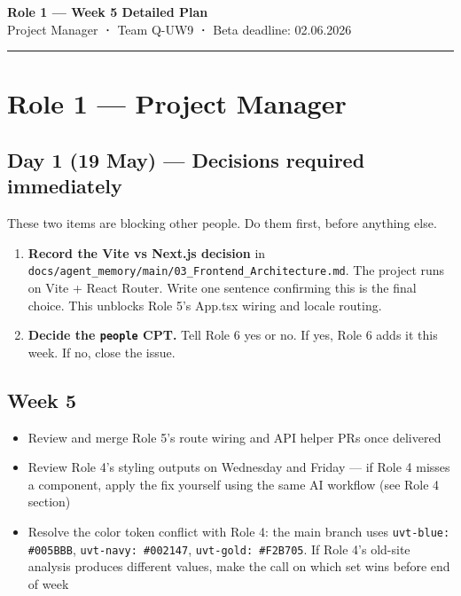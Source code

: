 \documentclass[11pt,a4paper]{article}
\begin{document}
\begin{center}
    {\Large\bfseries\color{uvtBlue} Role 1 — Week 5 Detailed Plan}\\[0.4em]
    {\small Project Manager \textbf{·} Team Q-UW9 \textbf{·} Beta deadline: 02.06.2026}
\end{center}
\vspace{0.3em}
\textcolor{uvtYellow}{\rule{\linewidth}{2pt}}
\vspace{0.8em}
\section{Role 1 — Project Manager}

\subsection{Day 1 (19 May) — Decisions required immediately}

These two items are blocking other people. Do them first, before anything else.

\begin{enumerate}
\item \textbf{Record the Vite vs Next.js decision} in \nolinkurl{docs/agent_memory/main/03_Frontend_Architecture.md}. The project runs on Vite + React Router. Write one sentence confirming this is the final choice. This unblocks Role 5's App.tsx wiring and locale routing.
\item \textbf{Decide the \nolinkurl{people} CPT.} Tell Role 6 yes or no. If yes, Role 6 adds it this week. If no, close the issue.
\end{enumerate}

\subsection{Week 5}

\begin{itemize}
\item Review and merge Role 5's route wiring and API helper PRs once delivered
\item Review Role 4's styling outputs on Wednesday and Friday — if Role 4 misses a component, apply the fix yourself using the same AI workflow (see Role 4 section)
\item Resolve the color token conflict with Role 4: the main branch uses \nolinkurl{uvt-blue: #005BBB}, \nolinkurl{uvt-navy: #002147}, \nolinkurl{uvt-gold: #F2B705}. If Role 4's old-site analysis produces different values, make the call on which set wins before end of week
\end{itemize}
\end{document}
